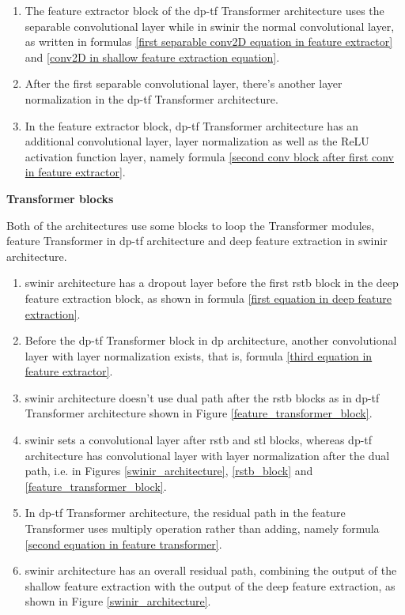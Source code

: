 \begin{enumerate}
    \item The feature extractor block of the \gls{dp}-\gls{tf} Transformer architecture uses the separable convolutional layer while in \gls{swinir} the normal convolutional layer, as written in formulas \ref{first separable conv2D equation in feature extractor} and \ref{conv2D in shallow feature extraction equation}.
    \item After the first separable convolutional layer, there's another layer normalization in the \gls{dp}-\gls{tf} Transformer architecture.
    \item In the feature extractor block, \gls{dp}-\gls{tf} Transformer architecture has an additional convolutional layer, layer normalization as well as the ReLU activation function layer, namely formula \ref{second conv block after first conv in feature extractor}.
\end{enumerate}

\begin{spacing}{1.5}
\textbf{\large{Transformer blocks}}
\end{spacing}
Both of the architectures use some blocks to loop the Transformer modules, feature Transformer in \gls{dp}-\gls{tf} architecture and deep feature extraction in \gls{swinir} architecture.

\begin{enumerate}[start=4]
    \item \gls{swinir} architecture has a dropout layer before the first \gls{rstb} block in the deep feature extraction block, as shown in formula \ref{first equation in deep feature extraction}.
    \item Before the \gls{dp}-\gls{tf} Transformer block in \gls{dp} architecture, another convolutional layer with layer normalization exists, that is, formula \ref{third equation in feature extractor}.
    \item \gls{swinir} architecture doesn't use dual path after the \gls{rstb} blocks as in \gls{dp}-\gls{tf} Transformer architecture shown in Figure \ref{feature_transformer_block}.
    \item \gls{swinir} sets a convolutional layer after \gls{rstb} and \gls{stl} blocks, whereas \gls{dp}-\gls{tf} architecture has convolutional layer with layer normalization after the dual path, i.e. in Figures \ref{swinir_architecture}, \ref{rstb_block} and \ref{feature_transformer_block}.
    \item In \gls{dp}-\gls{tf} Transformer architecture, the residual path in the feature Transformer uses multiply operation rather than adding, namely formula \ref{second equation in feature transformer}.
    \item \gls{swinir} architecture has an overall residual path, combining the output of the shallow feature extraction with the output of the deep feature extraction, as shown in Figure \ref{swinir_architecture}.
\end{enumerate}

